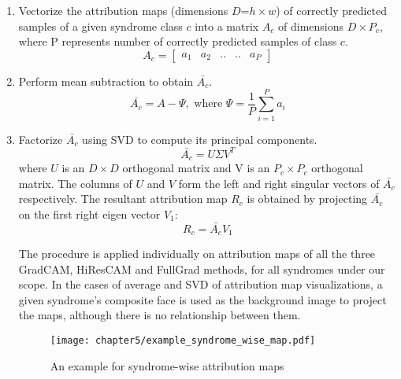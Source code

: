 \documentclass[../report.tex]{subfiles}
\begin{document}
	\begin{enumerate}
		\item Vectorize the attribution maps (dimensions $D$=$h\times w$) of correctly predicted samples of a given syndrome class $c$ into a matrix $A_{c}$ of dimensions  $D\times P_{c}$, where P represents number of correctly predicted samples of class $c$.
		\begin{equation*}
		A_{c} =	
		\begin{bmatrix}
			a_1 & a_2 & .. & .. & a_P 
		\end{bmatrix} 
	\end{equation*}
		\item Perform mean subtraction to obtain $\bar{A_{c}}$.
		\begin{equation*}
			\bar{A_{c}} = A - \Psi, \text{ where }  \Psi=\frac{1}{P}\sum^P_{i=1} a_i
		\end{equation*}
	
		
		\item Factorize $\bar{A_{c}}$ using SVD to compute its principal components.
		\begin{equation*}
			\bar{A_{c}} = U \Sigma {V}^T
		\end{equation*}
		where $U$ is an $D \times D$ orthogonal matrix and V is an $P_{c} \times P_{c}$ orthogonal matrix.  The columns of $U$ and $V$ form the left and right singular vectors of $\bar{A_{c}}$ respectively. The resultant attribution map $R_{c}$ is obtained by projecting $\bar{A_c}$ on the first right eigen vector $V_{1}$:
		\begin{equation*}
			R_{c} = \bar{A_{c}}V_{1}
		\end{equation*}
	
	The procedure is applied individually on attribution maps of all the three GradCAM, HiResCAM and FullGrad methods, for all syndromes under our scope. In the cases of average and SVD of attribution map visualizations, a given syndrome's composite face is used as the background image to project the maps, although there is no relationship between them.
	\begin{figure}[H]
		\hspace*{0cm}      
		\texttt{[image: chapter5/example\_syndrome\_wise\_map.pdf]}
		\caption{An example for syndrome-wise attribution maps}
		\label{fig_synd_maps}
	\end{figure}
	\end{enumerate}    
\end{document}
